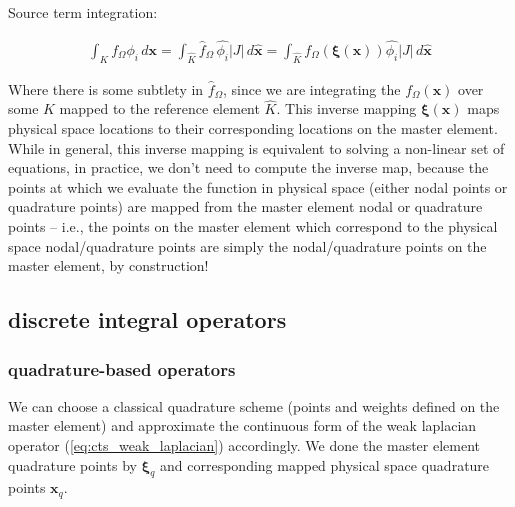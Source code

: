 \documentclass[10pt]{article}
\begin{document}
  Source term integration:

  \begin{align}
    \int_{K}^{} f_\Omega \phi_i\, d\bm{x} 
    = \int_{\widehat{K}}^{} \widehat{f}_\Omega\, \widehat{\phi_i} |J| \, d\bm{\widehat{x}}
    = \int_{\widehat{K}}^{} f_\Omega(\bm{\xi}(\bm{x})) \widehat{\phi_i} |J| \, d\bm{\widehat{x}}
  \end{align}

  Where there is some subtlety in $\widehat{f}_\Omega$, since we are integrating the
  $f_\Omega(\bm{x})$ over some $K$ mapped to the reference element $\widehat{K}$. 
  This inverse mapping $\bm{\xi}(\bm{x})$ maps physical space locations to their corresponding
  locations on the master element. While in general, this inverse mapping is equivalent to solving a
  non-linear set of equations, in practice, we don't need to compute the inverse map, because the
  points at which we evaluate the function in physical space (either nodal points or quadrature
  points) are mapped from the master element nodal or quadrature points -- i.e., the points on the
  master element which correspond to the physical space nodal/quadrature points are simply the
  nodal/quadrature points on the master element, by construction!

\subsection{discrete integral operators} \label{ssec:disc_integral_operators}
  \subsubsection{quadrature-based operators}

  We can choose a classical quadrature scheme (points and weights defined on the master element) and
  approximate the continuous form of the weak laplacian operator (\ref{eq:cts_weak_laplacian})
  accordingly. We done the master element quadrature points by $\bm{\xi}_q$ and corresponding mapped
  physical space quadrature points $\bm{x}_q$.\\
\end{document}
